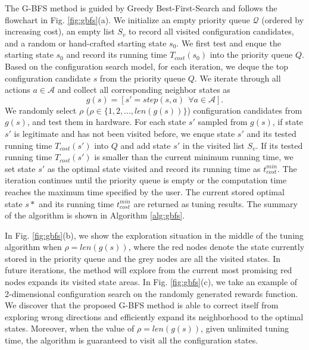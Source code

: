 The G-BFS method is guided by Greedy Best-First-Search and follows the flowchart in Fig. \ref{fig:gbfs}(a). We initialize an empty priority queue $\mathcal{Q}$ (ordered by increasing cost), an empty list $S_v$ to record all visited configuration candidates, and a random or hand-crafted starting state $s_0$. We first test and enque the starting state $s_0$ and record its running time $T_{cost}(s_0)$ into the priority queue $Q$. Based on the configuration search model, for each iteration, we deque the top configuration candidate $s$ from the priority queue $Q$. We iterate through all actions $a\in \mathcal{A}$ and collect all corresponding neighbor states as
\begin{equation}
    g(s) = [s'=step(s,a) ~~ \forall a \in \mathcal{A}].
\end{equation}
We randomly select $\rho$ ($\rho \in \{1,2,\ldots,len(g(s)) \}$) configuration candidates from $g(s)$, and test them in hardware. For each state $s'$ sampled from $g(s)$, if state $s'$ is legitimate and has not been visited before, we enque state $s'$ and its tested running time $T_{cost}(s')$ into $Q$ and add state $s'$ in the visited list $S_v$. If its tested running time $T_{cost}(s')$ is smaller than the current minimum running time, we set state $s'$ as the optimal state visited and record its running time as $t_{cost}^{min}$. The iteration continues until the priority queue is empty or the computation time reaches the maximum time specified by the user. The current stored optimal state $s*$ and its running time $t_{cost}^{min}$ are returned as tuning results. The summary of the algorithm is shown in Algorithm \ref{alg:gbfs}.

In Fig. \ref{fig:gbfs}(b), we show the exploration situation in the middle of the tuning algorithm when $\rho = len(g(s))$, where the red nodes denote the state currently stored in the priority queue and the grey nodes are all the visited states. In future iterations, the method will explore from the current most promising red nodes expands its visited state areas. In Fig. \ref{fig:gbfs}(c), we take an example of 2-dimensional configuration search on the randomly generated rewards function. We discover that the proposed G-BFS method is able to correct itself from exploring wrong directions and efficiently expand its neighborhood to the optimal states. Moreover, when the value of $\rho = len(g(s))$, given unlimited tuning time, the algorithm is guaranteed to visit all the configuration states.

